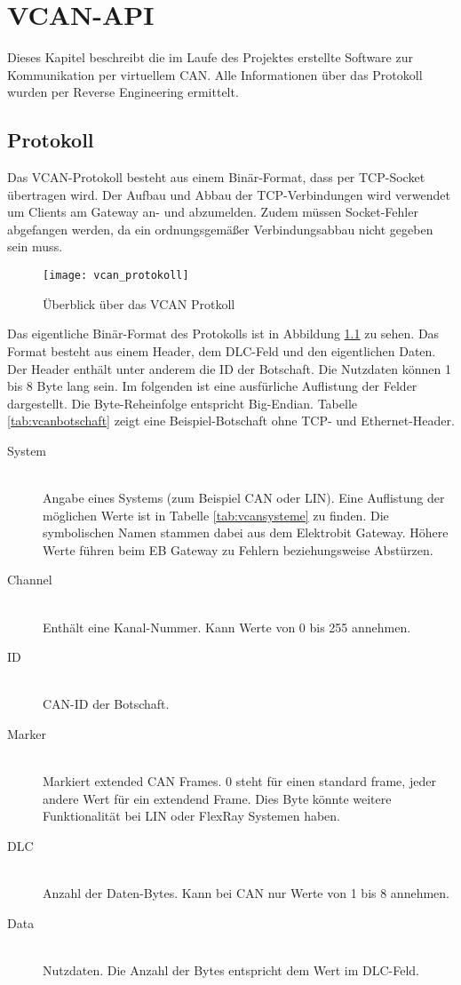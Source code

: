 \chapter{VCAN-API}
\label{sec:vcan_api}
Dieses Kapitel beschreibt die im Laufe des Projektes erstellte Software zur Kommunikation per virtuellem CAN. Alle Informationen über das Protokoll wurden per Reverse Engineering ermittelt.

\section{Protokoll}
\label{sec:vcan_protokoll}
Das VCAN-Protokoll besteht aus einem Binär-Format, dass per TCP-Socket übertragen wird. Der Aufbau und Abbau der TCP-Verbindungen wird verwendet um Clients am Gateway an- und abzumelden. Zudem müssen Socket-Fehler abgefangen werden, da ein ordnungsgemäßer Verbindungsabbau nicht gegeben sein muss.

\begin{figure}[ht]
\centering
\texttt{[image: vcan\_protokoll]}
\caption{Überblick über das VCAN Protkoll}
\label{fig:vcan_protokoll}
\end{figure}

Das eigentliche Binär-Format des Protokolls ist in Abbildung \ref{fig:vcan_protokoll} zu sehen. Das Format besteht aus einem Header, dem DLC-Feld und den eigentlichen Daten. Der Header enthält unter anderem die ID der Botschaft. Die Nutzdaten können 1 bis 8 Byte lang sein. Im folgenden ist eine ausfürliche Auflistung der Felder dargestellt. Die Byte-Reheinfolge entspricht Big-Endian. Tabelle \ref{tab:vcanbotschaft} zeigt eine Beispiel-Botschaft ohne TCP- und Ethernet-Header.

\begin{description}
    \item[System] \hfill \\ Angabe eines Systems (zum Beispiel CAN oder LIN). Eine Auflistung der möglichen Werte ist in Tabelle \ref{tab:vcansysteme} zu finden. Die symbolischen Namen stammen dabei aus dem Elektrobit Gateway. Höhere Werte führen beim EB Gateway zu Fehlern beziehungsweise Abstürzen.
    \item[Channel] \hfill \\ Enthält eine Kanal-Nummer. Kann Werte von 0 bis 255 annehmen.
    \item[ID] \hfill \\ CAN-ID der Botschaft.
    \item[Marker] \hfill \\ Markiert extended CAN Frames. 0 steht für einen standard frame, jeder andere Wert für ein extendend Frame. Dies Byte könnte weitere Funktionalität bei LIN oder FlexRay Systemen haben.
    \item[DLC] \hfill \\ Anzahl der Daten-Bytes. Kann bei CAN nur Werte von 1 bis 8 annehmen. 
    \item[Data] \hfill \\ Nutzdaten. Die Anzahl der Bytes entspricht dem Wert im DLC-Feld.
\end{description}


